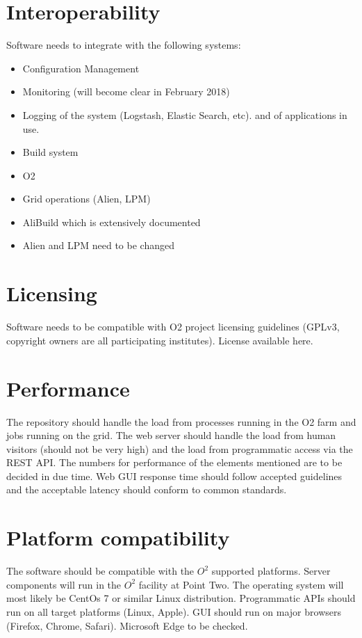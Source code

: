 \documentclass[a4paper,11pt]{book}
\begin{document}
\section{Interoperability}

Software needs to integrate with the following systems: 
\begin{itemize}
  \item Configuration Management
  \item Monitoring (will become clear in February 2018)
  \item Logging of the system (Logstash, Elastic Search, etc). and of applications in use.
  \item Build system
  \item O2 
  \item Grid operations (Alien, LPM) 
  \item AliBuild which is extensively documented
  \item Alien and LPM need to be changed
\end{itemize}


\section{Licensing}
Software needs to be compatible with O2 project licensing guidelines (GPLv3, copyright owners are all participating institutes). 
License available here. 

\section{Performance}
The repository should handle the load from processes running in the O2 farm and jobs running on the grid. The web server should handle the load from human visitors (should not be very high) and the load from programmatic access via the REST API. The numbers for performance of the elements mentioned are to be decided in due time. Web GUI response time should follow accepted guidelines and the acceptable latency should conform to common standards.

\section{Platform compatibility}
The software should be compatible with the $O^2$ supported platforms. Server components will run in the $O^2$ facility at Point Two. The operating system will most likely be CentOs 7 or similar Linux distribution. Programmatic APIs should run on all target platforms (Linux, Apple). GUI should run on major browsers (Firefox, Chrome, Safari). Microsoft Edge to be checked.
\end{document}

